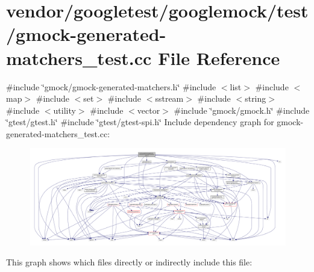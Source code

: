 \hypertarget{gmock-generated-matchers__test_8cc}{}\section{vendor/googletest/googlemock/test/gmock-\/generated-\/matchers\+\_\+test.cc File Reference}
\label{gmock-generated-matchers__test_8cc}
{\ttfamily \#include \char`\"{}gmock/gmock-\/generated-\/matchers.\+h\char`\"{}}\newline
{\ttfamily \#include $<$list$>$}\newline
{\ttfamily \#include $<$map$>$}\newline
{\ttfamily \#include $<$set$>$}\newline
{\ttfamily \#include $<$sstream$>$}\newline
{\ttfamily \#include $<$string$>$}\newline
{\ttfamily \#include $<$utility$>$}\newline
{\ttfamily \#include $<$vector$>$}\newline
{\ttfamily \#include \char`\"{}gmock/gmock.\+h\char`\"{}}\newline
{\ttfamily \#include \char`\"{}gtest/gtest.\+h\char`\"{}}\newline
{\ttfamily \#include \char`\"{}gtest/gtest-\/spi.\+h\char`\"{}}\newline
Include dependency graph for gmock-\/generated-\/matchers\+\_\+test.cc\+:
\nopagebreak
\begin{figure}[H]
\begin{center}
\leavevmode
\includegraphics[width=350pt]{gmock-generated-matchers__test_8cc__incl}
\end{center}
\end{figure}
This graph shows which files directly or indirectly include this file\+:
\nopagebreak
